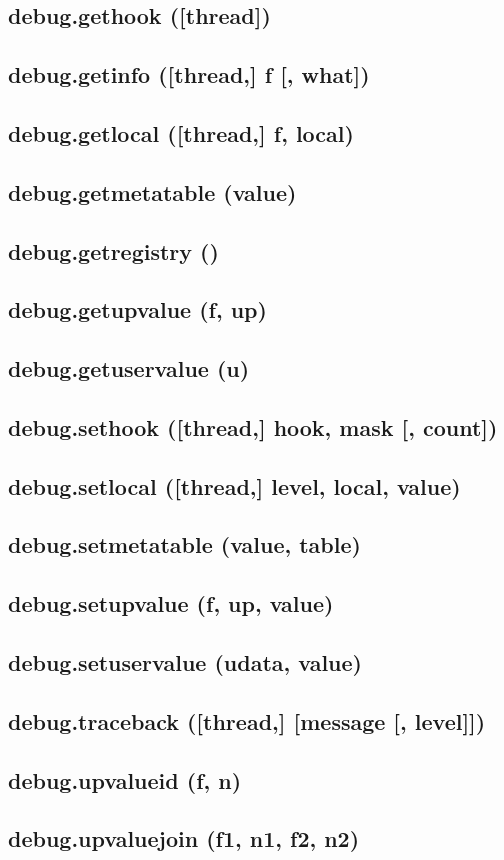\documentclass[12pt]{article}
\begin{document}
\subsection{debug.gethook ([thread])}

\subsection{debug.getinfo ([thread,] f [, what])}

\subsection{debug.getlocal ([thread,] f, local)}

\subsection{debug.getmetatable (value)}

\subsection{debug.getregistry ()}

\subsection{debug.getupvalue (f, up)}

\subsection{debug.getuservalue (u)}

\subsection{debug.sethook ([thread,] hook, mask [, count])}

\subsection{debug.setlocal ([thread,] level, local, value)}

\subsection{debug.setmetatable (value, table)}

\subsection{debug.setupvalue (f, up, value)}

\subsection{debug.setuservalue (udata, value)}

\subsection{debug.traceback ([thread,] [message [, level]])}

\subsection{debug.upvalueid (f, n)}

\subsection{debug.upvaluejoin (f1, n1, f2, n2)}
\end{document}
